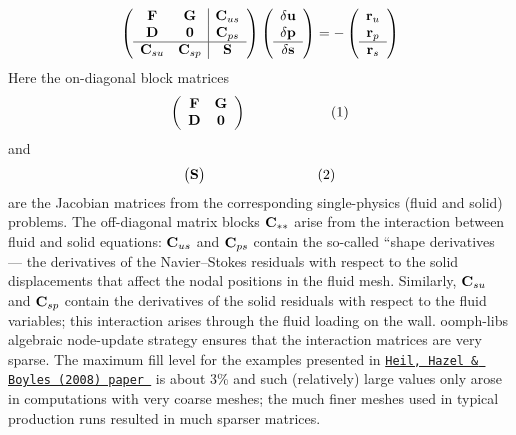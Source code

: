 \[ \left( \begin{array}{cc|c} {\bf F} & {\bf G} & {\bf C}_{us} \\ {\bf D} & {\bf 0} & {\bf C}_{ps} \\ \hline {\bf C}_{su} & {\bf C}_{sp} & {\bf S} \end{array} \right) \left( \begin{array}{c} \delta {\bf u} \\ \delta {\bf p} \\ \hline \delta {\bf s} \end{array} \right) = - \left( \begin{array}{c} {\bf r}_{u} \\ {\bf r}_{p} \\ \hline {\bf r}_{s} \end{array} \right) \] Here the on-\/diagonal block matrices \[ \left( \begin{array}{cc} {\bf F} & {\bf G} \\ {\bf D} & {\bf 0} \end{array} \right) \ \ \ \ \ \ \ \ \ \ \ \ \ \ \ \ \ \ (1) \] and \[ \big( {\bf S} \big) \ \ \ \ \ \ \ \ \ \ \ \ \ \ \ \ \ \ \ \ \ \ \ \ (2) \] are the Jacobian matrices from the corresponding single-\/physics (fluid and solid) problems. The off-\/diagonal matrix blocks ${\bf C}_{**}$ arise from the interaction between fluid and solid equations\+: $ {\bf C}_{us}$ and $ {\bf C}_{ps}$ contain the so-\/called ``shape derivatives\textquotesingle{}\textquotesingle{} --- the derivatives of the Navier--Stokes residuals with respect to the solid displacements that affect the nodal positions in the fluid mesh. Similarly, ${\bf C}_{su}$ and ${\bf C}_{sp}$ contain the derivatives of the solid residuals with respect to the fluid variables; this interaction arises through the fluid loading on the wall. {\ttfamily oomph-\/lib\textquotesingle{}s} algebraic node-\/update strategy ensures that the interaction matrices are very sparse. The maximum fill level for the examples presented in \href{http://www.springerlink.com/content/m3r6318701g338g4/}{\tt Heil, Hazel \& Boyle\textquotesingle{}s (2008) paper } is about 3\% and such (relatively) large values only arose in computations with very coarse meshes; the much finer meshes used in typical production runs resulted in much sparser matrices.

